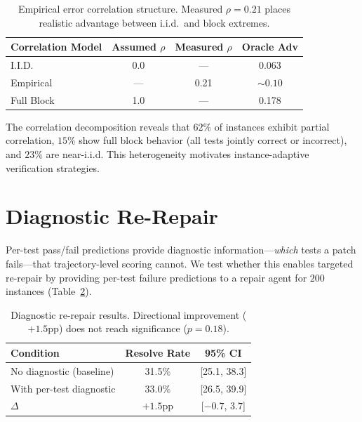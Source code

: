 \documentclass[11pt,a4paper]{article}
\begin{document}
\begin{table}[t]
\centering
\small
\caption{Empirical error correlation structure. Measured $\rho{=}0.21$ places realistic advantage between i.i.d.\ and block extremes.}
\label{tab:corr}
\begin{tabular}{lccc}
\toprule
\textbf{Correlation Model} & \textbf{Assumed $\rho$} & \textbf{Measured $\rho$} & \textbf{Oracle Adv} \\
\midrule
I.I.D. & 0.0 & --- & 0.063 \\
Empirical & --- & 0.21 & ${\sim}0.10$ \\
Full Block & 1.0 & --- & 0.178 \\
\bottomrule
\end{tabular}
\end{table}

The correlation decomposition reveals that $62\%$ of instances exhibit partial correlation, $15\%$ show full block behavior (all tests jointly correct or incorrect), and $23\%$ are near-i.i.d. This heterogeneity motivates instance-adaptive verification strategies.

\section{Diagnostic Re-Repair}
\label{sec:diagnostic}

Per-test pass/fail predictions provide diagnostic information---\emph{which} tests a patch fails---that trajectory-level scoring cannot. We test whether this enables targeted re-repair by providing per-test failure predictions to a repair agent for $200$ instances (Table~\ref{tab:rerepair}).

\begin{table}[t]
\centering
\small
\caption{Diagnostic re-repair results. Directional improvement ($+1.5$pp) does not reach significance ($p{=}0.18$).}
\label{tab:rerepair}
\begin{tabular}{lcc}
\toprule
\textbf{Condition} & \textbf{Resolve Rate} & \textbf{95\% CI} \\
\midrule
No diagnostic (baseline) & 31.5\% & [25.1, 38.3] \\
With per-test diagnostic & 33.0\% & [26.5, 39.9] \\
$\Delta$ & $+1.5$pp & [$-0.7$, $3.7$] \\
\bottomrule
\end{tabular}
\end{table}
\end{document}
